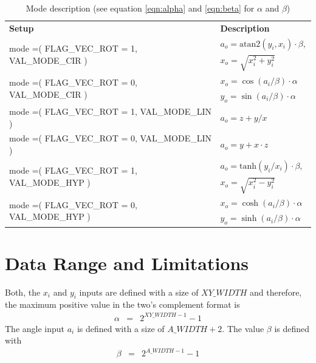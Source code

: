 \documentclass[a4paper, 12pt, notitlepage]{report}
\begin{document}
\begin{table}[htbp]
   \center
   \begin{tabular}{@{}ll@{}}
      \rowcolor{tableheadcolor}\textbf{Setup}& \textbf{Description} \\

      \multirow{2}{*}{mode =( FLAG\_VEC\_ROT = 1, VAL\_MODE\_CIR ) } & $a_o = \textrm{atan2}( y_i, x_i ) \cdot \beta,  $\\
                                                                     & $x_o = \sqrt{ x_i^2+y_i^2 }  $ \\\midrule 
      \multirow{2}{*}{mode =( FLAG\_VEC\_ROT = 0, VAL\_MODE\_CIR ) } & $x_o = \cos( a_i / \beta ) \cdot \alpha  $\\
                                                                     & $y_o = \sin( a_i / \beta ) \cdot \alpha  $\\\midrule 
      \multirow{1}{*}{mode =( FLAG\_VEC\_ROT = 1, VAL\_MODE\_LIN ) } & $a_o = z + y/x $\\\midrule
      \multirow{1}{*}{mode =( FLAG\_VEC\_ROT = 0, VAL\_MODE\_LIN ) } & $a_o = y + x\cdot z  $ $  $\\\midrule
      \multirow{2}{*}{mode =( FLAG\_VEC\_ROT = 1, VAL\_MODE\_HYP ) } & $a_o = \textrm{tanh}( y_i / x_i ) \cdot \beta,   $\\
                                                                     & $x_o = \sqrt{ x_i^2-y_i^2 }                                 $\\\midrule 
      \multirow{2}{*}{mode =( FLAG\_VEC\_ROT = 0, VAL\_MODE\_HYP ) } & $x_o = \cosh( a_i / \beta ) \cdot \alpha$\\
                                                                     & $y_o = \sinh( a_i / \beta ) \cdot \alpha$\\
      \bottomrule
   \end{tabular}
   \caption{Mode description (see equation \ref{eqn:alpha} and \ref{eqn:beta} for $\alpha$ and $\beta$)}
   \label{tab:modes}
\end{table} 


\section{Data Range and Limitations}

   Both, the $x_i$ and $y_i$ inputs are defined with a size of $XY\_WIDTH$ and therefore,
   the maximum positive value in the two's complement format is
   \begin{eqnarray}
   \alpha & = & 2^{XY\_WIDTH-1}-1
   \label{eqn:alpha}
   \end{eqnarray}
   The angle input $a_i$ is defined with a size of $A\_WIDTH+2$.
   The value $\beta$ is defined with
   \begin{eqnarray}
   \beta & = & 2^{A\_WIDTH-1} -1
   \label{eqn:beta}
   \end{eqnarray}
\end{document}
